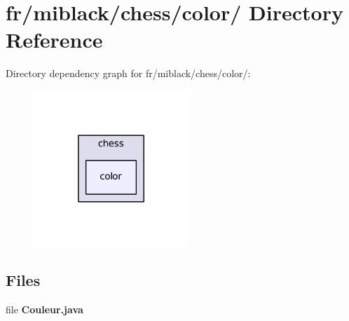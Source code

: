 \section{fr/miblack/chess/color/ Directory Reference}
\label{dir_04b9ffbc14e19d1069d40c59f473fe69}
Directory dependency graph for fr/miblack/chess/color/\-:
\nopagebreak
\begin{figure}[H]
\begin{center}
\leavevmode
\includegraphics[width=166pt]{dir_04b9ffbc14e19d1069d40c59f473fe69_dep}
\end{center}
\end{figure}
\subsection*{Files}
\begin{DoxyCompactItemize}
\item 
file {\bf Couleur.\-java}
\end{DoxyCompactItemize}
